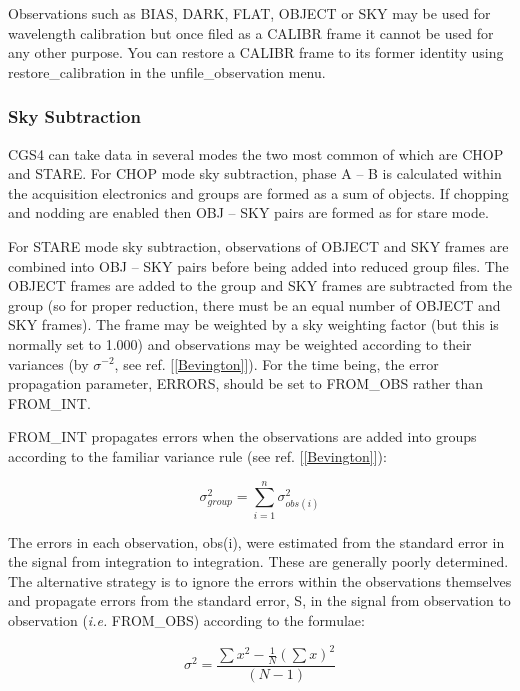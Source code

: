 {Observations such as {\sf BIAS}, {\sf DARK}, {\sf FLAT}, {\sf OBJECT} or 
{\sf SKY} may be used for wavelength calibration but once filed as a
{\sf CALIBR} frame it cannot be used for any other purpose. You can
restore a {\sf CALIBR} frame to its former identity using 
{\sf restore\_calibration} in the {\sf unfile\_observation} menu.

\subsubsection{Sky Subtraction}
\label{sky_subtraction}

CGS4 can take data in several modes the two most common of which are CHOP and 
STARE. For CHOP mode sky subtraction, phase A -- B is calculated within the
acquisition electronics and groups are formed as a sum of objects. If chopping
and nodding are enabled then {\sf OBJ -- SKY} pairs are formed as for stare 
mode.

For STARE mode sky subtraction, observations of {\sf OBJECT} and {\sf SKY} 
frames are combined into {\sf OBJ -- SKY} pairs before being added into 
reduced group files. The {\sf OBJECT} frames are added to the group and 
{\sf SKY} frames are subtracted from the group (so for proper reduction, there 
must be an equal number of {\sf OBJECT} and {\sf SKY} frames).
The frame may be weighted by a sky weighting factor (but this is normally set 
to 1.000) and observations may be weighted according to their variances (by
$\sigma^{-2}$, see ref. [\ref{Bevington}]). For the time being, the
error propagation parameter, {\sf ERRORS}, should be set to {\sf FROM\_OBS} 
rather than {\sf FROM\_INT}.

{\sf FROM\_INT} propagates errors when the observations are added into groups 
according to the familiar variance rule (see ref. [\ref{Bevington}]):

\begin{equation}
\sigma^{2}_{group} = \sum_{i=1}^{n} \sigma^{2}_{obs(i)}
\label{equation_2}
\end{equation}

The errors in each observation, obs(i), were estimated from the standard error
in the signal from integration to integration. These are generally poorly 
determined. The alternative strategy is to ignore the errors within the
observations themselves and propagate errors from the standard error, S, in the
signal from observation to observation ({\em i.e.} {\sf FROM\_OBS}) according 
to the formulae:

\begin{equation}
\sigma^{2} = \frac{\sum x^{2} - \frac{1}{N}(\sum x )^{2}}{(N-1)}
\label{equation_3}
\end{equation}

}
